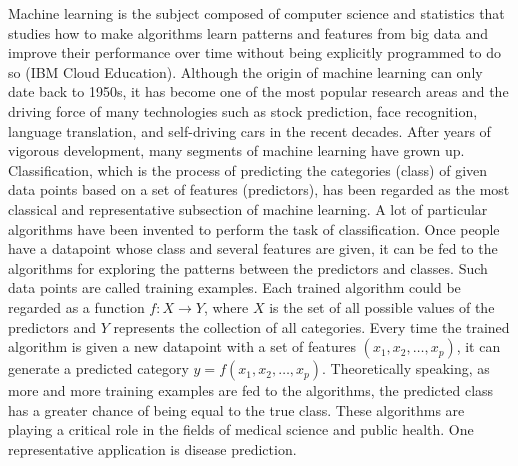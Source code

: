 \documentclass[preprint, 3p,
authoryear]{elsarticle} %
\begin{document}
Machine learning is the subject composed of computer science and
statistics that studies how to make algorithms learn patterns and
features from big data and improve their performance over time without
being explicitly programmed to do so \citep{IBM} (IBM Cloud Education).
Although the origin of machine learning can only date back to 1950s, it
has become one of the most popular research areas and the driving force
of many technologies such as stock prediction, face recognition,
language translation, and self-driving cars in the recent decades. After
years of vigorous development, many segments of machine learning have
grown up. Classification, which is the process of predicting the
categories (class) of given data points based on a set of features
(predictors), has been regarded as the most classical and representative
subsection of machine learning. A lot of particular algorithms have been
invented to perform the task of classification. Once people have a
datapoint whose class and several features are given, it can be fed to
the algorithms for exploring the patterns between the predictors and
classes. Such data points are called training examples. Each trained
algorithm could be regarded as a function \(f: X \rightarrow Y\), where
\(X\) is the set of all possible values of the predictors and \(Y\)
represents the collection of all categories. Every time the trained
algorithm is given a new datapoint with a set of features
\(\left(x_{1}, x_{2}, \ldots, x_{p}\right)\), it can generate a
predicted category \(y=f\left(x_{1}, x_{2}, \ldots, x_{p}\right)\).
Theoretically speaking, as more and more training examples are fed to
the algorithms, the predicted class has a greater chance of being equal
to the true class. These algorithms are playing a critical role in the
fields of medical science and public health. One representative
application is disease prediction.
\end{document}
